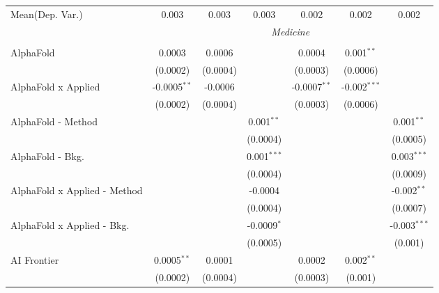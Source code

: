 \begin{tabular}{lcccccc}
Mean(Dep. Var.) & 0.003 & 0.003 & 0.003 & 0.002 & 0.002 & 0.002 \\
 & \multicolumn{6}{c}{\textit{Medicine}} \\ \\
   AlphaFold                      & 0.0003         & 0.0006        &                & 0.0004         & 0.001$^{**}$   &   \\   
                                  & (0.0002)       & (0.0004)      &                & (0.0003)       & (0.0006)       &   \\   
   AlphaFold x Applied            & -0.0005$^{**}$ & -0.0006       &                & -0.0007$^{**}$ & -0.002$^{***}$ &   \\   
                                  & (0.0002)       & (0.0004)      &                & (0.0003)       & (0.0006)       &   \\   
   AlphaFold - Method             &                &               & 0.001$^{**}$   &                &                & 0.001$^{**}$\\   
                                  &                &               & (0.0004)       &                &                & (0.0005)\\   
   AlphaFold - Bkg.               &                &               & 0.001$^{***}$  &                &                & 0.003$^{***}$\\   
                                  &                &               & (0.0004)       &                &                & (0.0009)\\   
   AlphaFold x Applied - Method   &                &               & -0.0004        &                &                & -0.002$^{**}$\\   
                                  &                &               & (0.0004)       &                &                & (0.0007)\\   
   AlphaFold x Applied - Bkg.     &                &               & -0.0009$^{*}$  &                &                & -0.003$^{***}$\\   
                                  &                &               & (0.0005)       &                &                & (0.001)\\   
   AI Frontier                    & 0.0005$^{**}$  & 0.0001        &                & 0.0002         & 0.002$^{**}$   &   \\   
                                  & (0.0002)       & (0.0004)      &                & (0.0003)       & (0.001)        &   \\   

\end{tabular}
